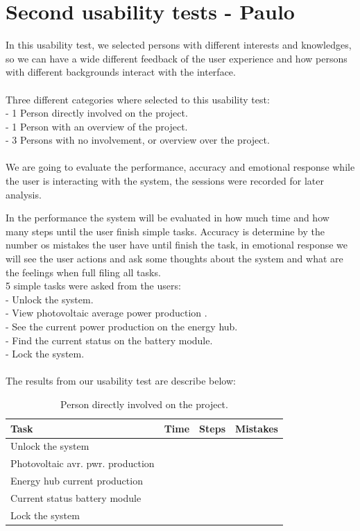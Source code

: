\section{Second usability tests - Paulo}

In this usability test, we selected persons with different interests and knowledges, so we can have a wide different feedback of the user experience and how persons with different backgrounds interact with the interface.
\\
\\Three different categories where selected to this usability test:\\
- 1 Person directly involved on the project.\\
- 1 Person with an overview of the project.\\
- 3 Persons with no involvement, or overview over the project.\\
\\

We are going to evaluate the performance, accuracy and emotional response while the user is interacting with the system, the sessions were recorded for later analysis.

In the performance the system will be evaluated in how much time and how many steps until the user finish simple tasks. Accuracy is determine by the number os mistakes the user have until finish the task, in emotional response we will see the user actions and ask some thoughts about the system and what are the feelings when full filing all tasks.
\\
5 simple tasks were asked from the users:\\
- Unlock the system.\\
- View photovoltaic average power production .\\
- See the current power production on the energy hub.\\
- Find the current status on the battery module.\\
- Lock the system.\\
\\
The results from our usability test are describe below:

\begin{table}[H]
\begin{tabular}{ | l | l | l | l |}
	\hline
	Task & Time & Steps & Mistakes \\ \hline
	Unlock the system & & & \\ \hline
	Photovoltaic avr. pwr. production & & & \\ \hline
	Energy hub current production & & & \\ \hline
	Current status battery module & & & \\ \hline
	Lock the system & & & \\ \hline
\end{tabular}
\caption{Person directly involved on the project.}
\end{table}

